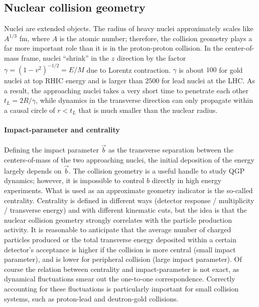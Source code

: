 \subsection{Nuclear collision geometry}
Nuclei are extended objects.
The radius of heavy nuclei approximately scales like $A^{1/3}$ fm, where  $A$ is the atomic number; therefore, the collision geometry plays a far more important role than it is in the proton-proton collision.
In the center-of-mass frame,  nuclei ``shrink'' in the $z$ direction by the factor $\gamma = (1-v^2)^{-1/2} = E/M$ due to Lorentz contraction.
$\gamma$ is about $100$ for gold nuclei at top RHIC energy and is larger than $2500$ for lead nuclei at the LHC.
As a result, the approaching nuclei takes a very short time to penetrate each other $t_L = 2R/\gamma$, while dynamics in the transverse direction can only propagate within a causal circle of $r < t_L$ that is much smaller than the nuclear radius.

\paragraph{Impact-parameter and centrality} Defining the impact parameter $\vec{b}$ as the transverse separation between the centers-of-mass of the two approaching nuclei, the initial deposition of the energy largely depends on $\vec{b}$.
The collision geometry is a useful handle to study QGP dynamics; however,
it is impossible to control $b$ directly in high energy experiments.
What is used as an approximate geometry indicator is the so-called centrality.
Centrality is defined in different ways (detector response / multiplicity / transverse energy) and with different kinematic cuts, but the idea is that the nuclear collision geometry strongly correlates with the particle production activity.
It is reasonable to anticipate that the average number of charged particles produced or the total transverse energy deposited within a certain detector's acceptance is higher if the collision is more central (small impact parameter), and is lower for peripheral collision (large impact parameter).
Of course the relation between centrality and impact-parameter is not exact, as dynamical fluctuations smear out the one-to-one correspondence.
Correctly accounting for these fluctuations is particularly important for small collision systems, such as proton-lead and deutron-gold collisions.

